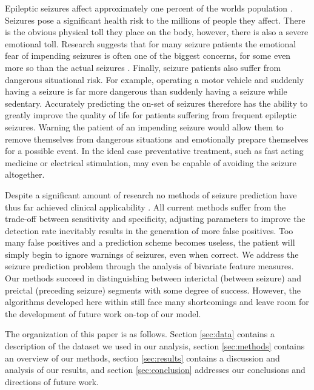 Epileptic seizures affect approximately one percent of the worlds population \cite{mirowski08}.  Seizures pose a significant health risk to the millions of people they affect.  There is the obvious physical toll they place on the body, however, there is also a severe emotional toll.  Research suggests that for many seizure patients the emotional fear of impending seizures is often one of the biggest concerns, for some even more so than the actual seizures \cite{fisher00}.  Finally, seizure patients also suffer from dangerous situational risk.  For example, operating a motor vehicle and suddenly having a seizure is far more dangerous than suddenly having a seizure while sedentary.  Accurately predicting the on-set of seizures therefore has the ability to greatly improve the quality of life for patients suffering from frequent epileptic seizures.  Warning the patient of an impending seizure would allow them to remove themselves from dangerous situations and emotionally prepare themselves for a possible event.  In the ideal case preventative treatment, such as fast acting medicine or electrical stimulation, may even be capable of avoiding the seizure altogether.


Despite a significant amount of research no methods of seizure prediction have thus far achieved clinical applicability \cite{mirowski08}.  All current methods suffer from the trade-off between sensitivity and specificity, adjusting parameters to improve the detection rate inevitably results in the generation of more false positives.  Too many false positives and a prediction scheme becomes useless, the patient will simply begin to ignore warnings of seizures, even when correct.  We address the seizure prediction problem through the analysis of bivariate feature measures.  Our methods succeed in distinguishing between interictal (between seizure) and preictal (preceding seizure) segments with some degree of success.  However, the algorithms developed here within still face many shortcomings and leave room for the development of future work on-top of our model. 

The organization of this paper is as follows.  Section \ref{sec:data} contains a description of the dataset we used in our analysis, section \ref{sec:methods} contains an overview of our methods, section \ref{sec:results} contains a discussion and analysis of our results, and section \ref{sec:conclusion} addresses our conclusions and directions of future work.
